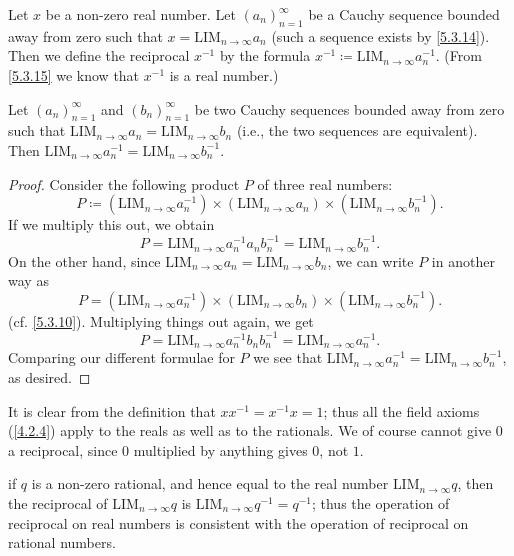 \begin{defn}\label{5.3.16}
  Let \(x\) be a non-zero real number.
  Let \((a_n)_{n = 1}^{\infty}\) be a Cauchy sequence bounded away from zero such that \(x = \text{LIM}_{n \to \infty} a_n\) (such a sequence exists by \cref{5.3.14}).
  Then we define the reciprocal \(x^{-1}\) by the formula \(x^{-1} \coloneqq \text{LIM}_{n \to \infty} a_n^{-1}\).
  (From \cref{5.3.15} we know that \(x^{-1}\) is a real number.)
\end{defn}

\begin{lem}\label{5.3.17}
  Let \((a_n)_{n = 1}^{\infty}\) and \((b_n)_{n = 1}^{\infty}\) be two Cauchy sequences bounded away from zero such that \(\text{LIM}_{n \to \infty} a_n = \text{LIM}_{n \to \infty} b_n\) (i.e., the two sequences are equivalent).
  Then \(\text{LIM}_{n \to \infty} a_n^{-1} = \text{LIM}_{n \to \infty} b_n^{-1}\).
\end{lem}

\begin{proof}
  Consider the following product \(P\) of three real numbers:
  \[
    P \coloneqq (\text{LIM}_{n \to \infty} a_n^{-1}) \times (\text{LIM}_{n \to \infty} a_n) \times (\text{LIM}_{n \to \infty} b_n^{-1}).
  \]
  If we multiply this out, we obtain
  \[
    P = \text{LIM}_{n \to \infty} a_n^{-1} a_n b_n^{-1} = \text{LIM}_{n \to \infty} b_n^{-1}.
  \]
  On the other hand, since \(\text{LIM}_{n \to \infty} a_n = \text{LIM}_{n \to \infty} b_n\), we can write \(P\) in another way as
  \[
    P = (\text{LIM}_{n \to \infty} a_n^{-1}) \times (\text{LIM}_{n \to \infty} b_n) \times (\text{LIM}_{n \to \infty} b_n^{-1}).
  \]
  (cf. \cref{5.3.10}).
  Multiplying things out again, we get
  \[
    P = \text{LIM}_{n \to \infty} a_n^{-1} b_n b_n^{-1} = \text{LIM}_{n \to \infty} a_n^{-1}.
  \]
  Comparing our different formulae for \(P\) we see that \(\text{LIM}_{n \to \infty} a_n^{-1} = \text{LIM}_{n \to \infty} b_n^{-1}\), as desired.
\end{proof}

\begin{note}
  It is clear from the definition that \(xx^{-1} = x^{-1}x = 1\);
  thus all the field axioms (\cref{4.2.4}) apply to the reals as well as to the rationals.
  We of course cannot give \(0\) a reciprocal, since \(0\) multiplied by anything gives \(0\), not \(1\).
\end{note}

\begin{note}
  if \(q\) is a non-zero rational, and hence equal to the real number \(\text{LIM}_{n \to \infty} q\), then the reciprocal of \(\text{LIM}_{n \to \infty} q\) is \(\text{LIM}_{n \to \infty} q^{-1} = q^{-1}\);
  thus the operation of reciprocal on real numbers is consistent with the operation of reciprocal on rational numbers.
\end{note}


